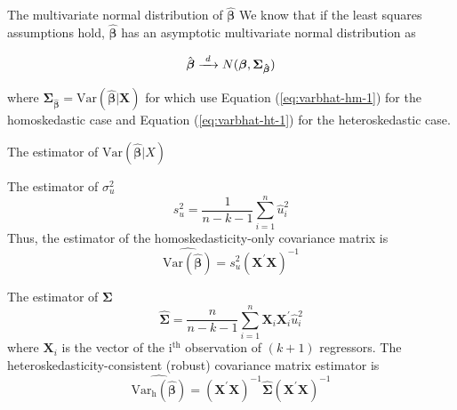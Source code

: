 \documentclass[presentation,10pt]{beamer}
\newcommand{\var}{\mathrm{Var}}
\newcommand{\rarrowd}[1]{\xrightarrow{\text{ \textit #1 }}}
\begin{document}
\begin{frame}[label={sec:org5415c7f}]{The multivariate normal distribution of \(\hat{\mathbf{\beta}}\)}
We know that if the least squares assumptions hold,
\(\hat{\boldsymbol{\beta}}\) has an asymptotic multivariate normal
distribution as

\begin{equation}
\label{eq:normal-bhat-m}
\hat{\boldsymbol{\beta}} \rarrowd{d} N(\boldsymbol{\beta}, \boldsymbol{\Sigma_{\hat{\boldsymbol{\beta}}}})
\end{equation}

where \(\boldsymbol{\Sigma_{\hat{\boldsymbol{\beta}}}} =
\var(\hat{\boldsymbol{\beta}} | \mathbf{X})\) for which use
Equation (\ref{eq:varbhat-hm-1}) for the homoskedastic case and Equation
(\ref{eq:varbhat-ht-1}) for the heteroskedastic case.
\end{frame}

\begin{frame}[label={sec:org8e94813}]{The estimator of \(\var(\hat{\boldsymbol{\beta}}|X)\)}
\begin{block}{The estimator of \(\sigma^2_u\)}
\begin{equation}
\label{eq:sigma2u}
s^2_u = \frac{1}{n-k-1} \sum_{i=1}^n \hat{u}^2_i
\end{equation}
Thus, the estimator of the homoskedasticity-only covariance matrix
is
\begin{equation}
\label{eq:hat-vbhat-hm}
\widehat{\var(\hat{\boldsymbol{\beta}})} = s^2_u (\mathbf{X}^{\prime} \mathbf{X})^{-1}
\end{equation}
\end{block}

\begin{block}{The estimator of \(\boldsymbol{\Sigma}\)}
\begin{equation}
\label{eq:Sigmahat}
\widehat{\boldsymbol{\Sigma}} = \frac{n}{n-k-1} \sum_{i=1}^n
\mathbf{X}_i \mathbf{X}_i^{\prime} \hat{u}^2_i
\end{equation}
where \(\mathbf{X}_i\) is the vector of the i\(^{\text{th}}\)
observation of \((k+1)\) regressors.
The \alert{heteroskedasticity-consistent (robust) covariance matrix estimator} is
\begin{equation}
\label{eq:hat-vbhat-ht}
\widehat{\var_{\mathrm{h}}(\hat{\boldsymbol{\beta}})} = \left(\mathbf{X}^{\prime} \mathbf{X}\right)^{-1} \widehat{\boldsymbol{\Sigma}} (\mathbf{X}^{\prime} \mathbf{X})^{-1}
\end{equation}
\end{block}
\end{frame}
\end{document}
